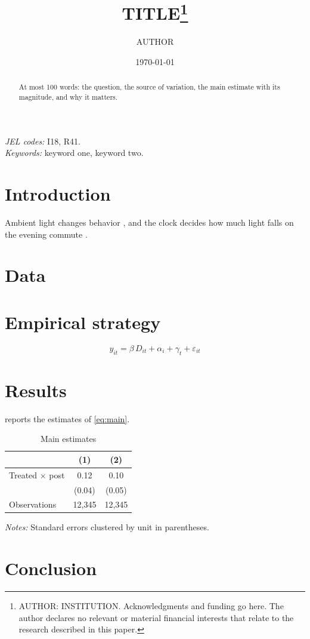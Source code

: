 \documentclass[12pt]{article}
\title{{{TITLE}}\thanks{{{AUTHOR}}: {{INSTITUTION}}. Acknowledgments and funding go here. The author declares no relevant or material financial interests that relate to the research described in this paper.}}
\author{{{AUTHOR}}}
\date{\today}
\begin{document}
\begin{singlespace}
\maketitle
\begin{abstract}
\noindent At most 100 words: the question, the source of variation, the main estimate with its magnitude, and why it matters.
\end{abstract}
\noindent\textit{JEL codes:} I18, R41. \\
\noindent\textit{Keywords:} keyword one, keyword two.
\end{singlespace}
\clearpage

\section{Introduction}\label{sec:intro}
Ambient light changes behavior \citep{doleac2015under}, and the clock decides how much light falls on the evening commute \citep{smith2016spring}.

\section{Data}\label{sec:data}

\section{Empirical strategy}\label{sec:strategy}
\begin{equation}\label{eq:main}
  y_{it} = \beta \, D_{it} + \alpha_i + \gamma_t + \varepsilon_{it}
\end{equation}

\section{Results}\label{sec:results}
 reports the estimates of \cref{eq:main}.

\begin{table}[t]
  \centering
  \begin{threeparttable}
  \caption{Main estimates}\label{tab:main}
  \begin{tabular}{lcc}
    \toprule
    & (1) & (2) \\
    \midrule
    Treated $\times$ post & 0.12 & 0.10 \\
                          & (0.04) & (0.05) \\
    \midrule
    Observations & 12{,}345 & 12{,}345 \\
    \bottomrule
  \end{tabular}
  \begin{tablenotes}\footnotesize
    \item \textit{Notes:} Standard errors clustered by unit in parentheses.
  \end{tablenotes}
  \end{threeparttable}
\end{table}

\section{Conclusion}\label{sec:conclusion}

\clearpage
\singlespacing


\end{document}
